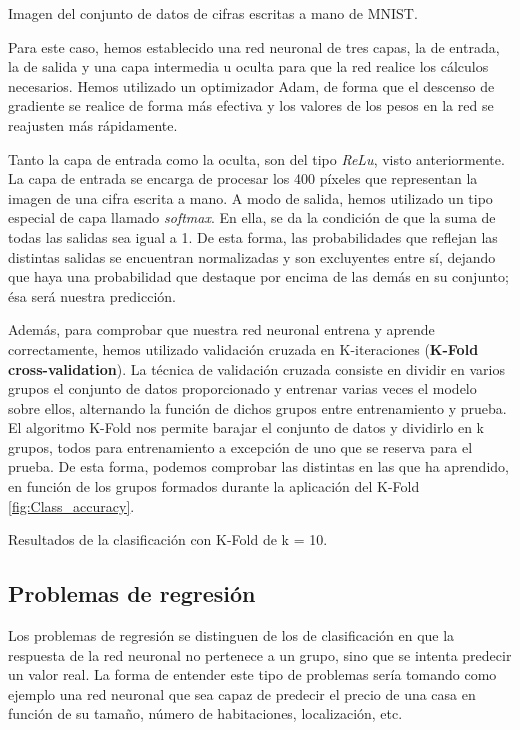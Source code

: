 %
       {Imagen del conjunto de datos de cifras escritas a mano de MNIST.} 

Para este caso, hemos establecido una red neuronal de tres capas, la de entrada, la de salida y una capa intermedia u oculta para que la red realice los cálculos necesarios. Hemos utilizado un optimizador Adam, de forma que el descenso de gradiente se realice de forma más efectiva y los valores de los pesos en la red se reajusten más rápidamente.

Tanto la capa de entrada como la oculta, son del tipo \textit{ReLu}, visto anteriormente. La capa de entrada se encarga de procesar los 400 píxeles que representan la imagen de una cifra escrita a mano. A modo de salida, hemos utilizado un tipo especial de capa llamado \textit{softmax}. En ella, se da la condición de que la suma de todas las salidas sea igual a 1. De esta forma, las probabilidades que reflejan las distintas salidas se encuentran normalizadas y son excluyentes entre sí, dejando que haya una probabilidad que destaque por encima de las demás en su conjunto; ésa será nuestra predicción. 

Además, para comprobar que nuestra red neuronal entrena y aprende correctamente, hemos utilizado validación cruzada en K-iteraciones (\textbf{K-Fold cross-validation}). La técnica de validación cruzada consiste en dividir en varios grupos el conjunto de datos proporcionado y entrenar varias veces el modelo sobre ellos, alternando la función de dichos grupos entre entrenamiento y prueba. El algoritmo K-Fold nos permite barajar el conjunto de datos y dividirlo en k grupos, todos para entrenamiento a excepción de uno que se reserva para el prueba. De esta forma, podemos comprobar las distintas en las que ha aprendido, en función de los grupos formados durante la aplicación del K-Fold \ref{fig:Class_accuracy}.

%
        {Resultados de la clasificación con K-Fold de k = 10.}

\subsection{Problemas de regresión}
Los problemas de regresión se distinguen de los de clasificación en que la respuesta de la red neuronal no pertenece a un grupo, sino que se intenta predecir un valor real. La forma de entender este tipo de problemas sería tomando como ejemplo una red neuronal que sea capaz de predecir el precio de una casa en función de su tamaño, número de habitaciones, localización, etc.

